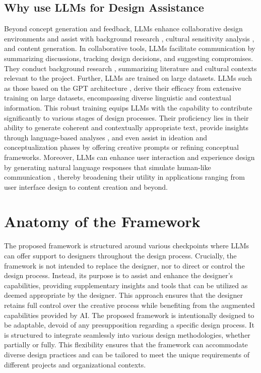 \documentclass{article}
\begin{document}
\subsection{Why use LLMs for Design Assistance}
Beyond concept generation \cite{barua2024concept} and feedback, LLMs enhance collaborative design environments and assist with background research \cite{aubin2024llms}, cultural sensitivity analysis \cite{adilazuarda2024towards}, and content generation. In collaborative tools, LLMs facilitate communication by summarizing discussions, tracking design decisions, and suggesting compromises. They conduct background research \cite{whitfield2023elicit}, summarizing literature and cultural contexts \cite{jin2024comprehensive} relevant to the project. Further, LLMs are trained on large datasets. LLMs such as those based on the GPT architecture \cite{openai_chatgpt}, derive their efficacy from extensive training on large datasets, encompassing diverse linguistic and contextual information. This robust training equips LLMs with the capability to contribute significantly to various stages of design processes. Their proficiency lies in their ability to generate coherent and contextually appropriate text, provide insights through language-based analyses \cite{zhang2023redefining}, and even assist in ideation and conceptualization phases by offering creative prompts or refining conceptual frameworks. Moreover, LLMs can enhance user interaction and experience design by generating natural language responses that simulate human-like communication \cite{cai2023does}, thereby broadening their utility in applications ranging from user interface design to content creation and beyond.



\section{Anatomy of the Framework}
The proposed framework is structured around various checkpoints where LLMs can offer support to designers throughout the design process. Crucially, the framework is not intended to replace the designer, nor to direct or control the design process. Instead, its purpose is to assist and enhance the designer's capabilities, providing supplementary insights and tools that can be utilized as deemed appropriate by the designer. This approach ensures that the designer retains full control over the creative process while benefiting from the augmented capabilities provided by AI. The proposed framework is intentionally designed to be adaptable, devoid of any presupposition regarding a specific design process. It is structured to integrate seamlessly into various design methodologies, whether partially or fully. This flexibility ensures that the framework can accommodate diverse design practices and can be tailored to meet the unique requirements of different projects and organizational contexts. 
\end{document}
